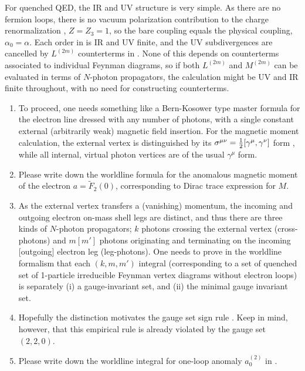 For quenched QED, the IR and UV structure is very simple. As there are no
fermion loops, there is no vacuum polarization contribution to the charge
renormalization , $Z=Z_3=1$, so the bare coupling equals
the physical coupling, $\alpha_0= \alpha$. Each order in
 is IR and UV finite, and the UV subdivergences are
cancelled by $L^{(2m)}$ counterterms in . None
of this depends on counterterms associated to individual Feynman
diagrams, so if both $L^{(2m)}$ and $M^{(2m)}$ can be evaluated in terms of
$N$-photon propagators, the calculation might be UV and IR finite
throughout, with no need for constructing counterterms.

\begin{enumerate}
  \item
To proceed, one needs something like a Bern-Kosower type
master formula for the electron line dressed with any number of photons,
with a single constant external (arbitrarily weak) magnetic field insertion.
For the magnetic moment calculation, the external vertex is distinguished
by its
\(
\sigma^{\mu\nu}={1\over 2}[\gamma^{\mu},\gamma^{\nu}]
\)
form , while all internal, virtual photon vertices
are of the usual $\gamma^{\mu}$ form.
  \item
Please write down
the worldline formula for the anomalous magnetic moment
of the electron $a=\tilde{F}_2(0)$, corresponding to Dirac trace
expression  for $M$.
  \item
As the external vertex transfers a (vanishing) momentum, the
incoming and outgoing electron on-mass shell legs are distinct, and thus
there are three kinds of $N$-photon propagators; $k$ photons crossing the
external vertex (cross-photons) and $m [m']$ photons originating and
terminating on the incoming [outgoing] electron leg (leg-photons). One
needs to prove in the worldline formalism that each $(k,m,m')$
integral (corresponding to a set of quenched set of 1-particle
irreducible Feynman vertex diagrams without electron loops) is separately
(i) a gauge-invariant set, and
(ii) the minimal gauge invariant set.
  \item
Hopefully the distinction motivates the  gauge set sign rule
. Keep in mind, however, that this empirical rule is
already violated by the gauge set $(2,2,0)$.
  \item
Please write down
the worldline integral for one-loop anomaly $a_{0}^{(2)}$ in
.

\end{enumerate}
